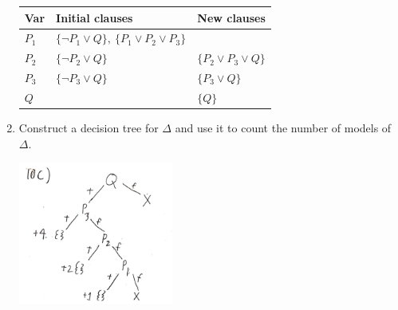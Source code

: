 \documentclass[11pt]{exam}
\begin{document}
\begin{questions}
\begin{enumerate}[label={\alph*}]
        \begin{center}
    \begin{tabular}{@{}p{1cm} p{5cm} p{7cm}@{}}
    	\textbf{Var} & \textbf{Initial clauses} & \textbf{New clauses} \\
    \hline
    $P_1$ & $\{\lnot P_1 \lor Q\},\ \{P_1 \lor P_2 \lor P_3\}$ & \\
    $P_2$ & $\{\lnot P_2 \lor Q\}$ & $\{P_2\lor P_3\lor Q\}$\\
    $P_3$ & $\{\lnot P_3 \lor Q\}$ & $\{P_3\lor Q\}$\\
    $Q$   &  & $\{Q\}$\\
    \end{tabular}
        \end{center}
\item Construct a decision tree for $\Delta$ and use it to count the number of models of $\Delta$.
\begin{center}
        \includegraphics[width=0.4\textwidth]{src/q10.png}
    \end{center}
\end{enumerate}
\end{questions}
\end{document}
